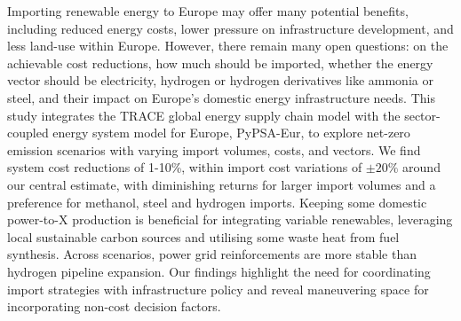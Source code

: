 Importing renewable energy to Europe may offer many potential benefits,
including reduced energy costs, lower pressure on infrastructure development,
and less land-use within Europe. However, there remain many open questions: on
the achievable cost reductions, how much should be imported, whether the energy
vector should be electricity, hydrogen or hydrogen derivatives like ammonia or
steel, and their impact on Europe's domestic energy infrastructure needs. This
study integrates the TRACE global energy supply chain model with the
sector-coupled energy system model for Europe, PyPSA-Eur, to explore net-zero
emission scenarios with varying import volumes, costs, and vectors. We find
system cost reductions of 1-10\%, within import cost variations of $\pm20\%$
around our central estimate, with diminishing returns for larger import volumes
and a preference for methanol, steel and hydrogen imports. Keeping some domestic
power-to-X production is beneficial for integrating variable renewables,
leveraging local sustainable carbon sources and utilising some waste heat from
fuel synthesis. Across scenarios, power grid reinforcements are more stable than
hydrogen pipeline expansion. Our findings highlight the need for coordinating
import strategies with infrastructure policy and reveal maneuvering space for
incorporating non-cost decision factors.
